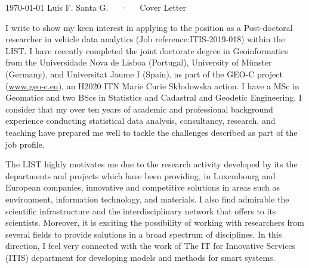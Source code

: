 \documentclass[11pt, a4paper]{awesome-cv}
\begin{document}
\makecvheader[R]

\makecvfooter
  {\today}
    {Luis F. Santa G.~~~·~~~Cover Letter}
  {}

\makelettertitle

\begin{cvletter}

I write to show my keen interest in applying to the position as a Post-doctoral researcher in vehicle data analytics (Job reference:ITIS-2019-018) within the LIST. I have recently completed the joint doctorate degree in Geoinformatics from the Universidade Nova de Lisboa (Portugal), University of Münster (Germany), and Universitat Jaume I (Spain), as part of the GEO-C project (\url{www.geo-c.eu}), an H2020 ITN Marie Curie Skłodowska action. I have a MSc in Geomatics and two BScs in Statistics and Cadastral and Geodetic Engineering. I consider that my over ten years of academic and professional background experience conducting statistical data analysis, consultancy, research, and teaching have prepared me well to tackle the challenges described as part of the job profile.\par 
The LIST highly motivates me due to the research activity developed by its the departments and projects which have been providing, in Luxembourg and European companies, innovative and competitive solutions in areas such as environment, information technology, and materials. I also find admirable the scientific infrastructure and the interdisciplinary network that offers to its scientists. Moreover, it is exciting the possibility of working with researchers from several fields to provide solutions in a broad spectrum of disciplines. In this direction, I feel very connected with the work of The IT for Innovative Services (ITIS) department for developing models and methods for smart systems.\par

\end{cvletter}
\end{document}
